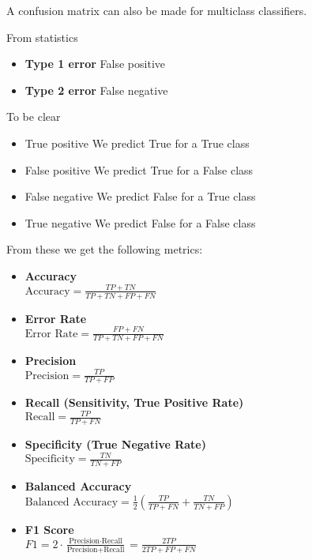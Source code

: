 A confusion matrix can also be made for multiclass classifiers.

\vspace{10pt}

From statistics

\begin{itemize}
    \item \textbf{Type 1 error} \ra False positive
    \item \textbf{Type 2 error} \ra False negative
\end{itemize}

To be clear

\begin{itemize}
    \item True positive \ra We predict True for a True class
    \item False positive \ra We predict True for a False class
    \item False negative \ra We predict False for a True class
    \item True negative \ra We predict False for a False class
\end{itemize}


From these we get the following metrics:

\begin{itemize}

  \item \textbf{Accuracy} \\
  $\displaystyle \text{Accuracy} = \frac{TP + TN}{TP + TN + FP + FN}$

  \item \textbf{Error Rate} \\
  $\displaystyle \text{Error Rate} = \frac{FP + FN}{TP + TN + FP + FN}$

  \item \textbf{Precision} \\
  $\displaystyle \text{Precision} = \frac{TP}{TP + FP}$

  \item \textbf{Recall (Sensitivity, True Positive Rate)} \\
  $\displaystyle \text{Recall} = \frac{TP}{TP + FN}$

  \item \textbf{Specificity (True Negative Rate)} \\
  $\displaystyle \text{Specificity} = \frac{TN}{TN + FP}$

  \item \textbf{Balanced Accuracy} \\
  $\displaystyle \text{Balanced Accuracy} = \frac{1}{2} \left( \frac{TP}{TP + FN} + \frac{TN}{TN + FP} \right)$

  \item \textbf{F1 Score} \\
  $\displaystyle F1 = 2 \cdot \frac{\text{Precision} \cdot \text{Recall}}{\text{Precision} + \text{Recall}} = \frac{2TP}{2TP + FP + FN}$

\end{itemize}

